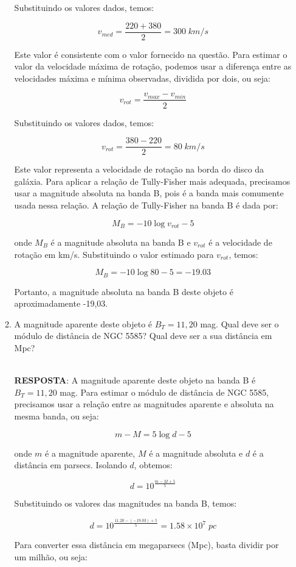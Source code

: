 \documentclass[a4paper,12pt]{article}
\begin{document}
\begin{enumerate}
\begin{enumerate}
Substituindo os valores dados, temos:

$$v_{med} = \frac{220 + 380}{2} = 300 \; km/s$$

Este valor é consistente com o valor fornecido na questão. Para estimar o valor da velocidade máxima de rotação, podemos usar a diferença entre as velocidades máxima e mínima observadas, dividida por dois, ou seja:

$$v_{rot} = \frac{v_{max} - v_{min}}{2}$$

Substituindo os valores dados, temos:

$$v_{rot} = \frac{380 - 220}{2} = 80 \; km/s$$

Este valor representa a velocidade de rotação na borda do disco da galáxia. Para aplicar a relação de Tully-Fisher mais adequada, precisamos usar a magnitude absoluta na banda B, pois é a banda mais comumente usada nessa relação. A relação de Tully-Fisher na banda B é dada por:

$$M_B = -10 \log v_{rot} - 5$$

onde $M_B$ é a magnitude absoluta na banda B e $v_{rot}$ é a velocidade de rotação em km/s. Substituindo o valor estimado para $v_{rot}$, temos:

$$M_B = -10 \log 80 - 5 = -19.03$$

Portanto, a magnitude absoluta na banda B deste objeto é aproximadamente -19,03.

\noindent\hrulefill

\item A magnitude aparente deste objeto é $B_T=11,20$ mag. Qual deve ser o 
módulo de distância de NGC 5585? Qual deve ser a sua distância em Mpc?

\noindent\hrulefill\\\textbf{RESPOSTA}: A magnitude aparente deste objeto na banda B é $B_T = 11,20$ mag. Para estimar o módulo de distância de NGC 5585, precisamos usar a relação entre as magnitudes aparente e absoluta na mesma banda, ou seja:

$$m - M = 5 \log d - 5$$

onde $m$ é a magnitude aparente, $M$ é a magnitude absoluta e $d$ é a distância em parsecs. Isolando $d$, obtemos:

$$d = 10^{\frac{m - M + 5}{5}}$$

Substituindo os valores das magnitudes na banda B, temos:

$$d = 10^{\frac{11.20 - (-19.03) + 5}{5}} = 1.58 \times 10^7 \; pc$$

Para converter essa distância em megaparsecs (Mpc), basta dividir por um milhão, ou seja:


\end{enumerate}
\end{enumerate}
\end{document}
